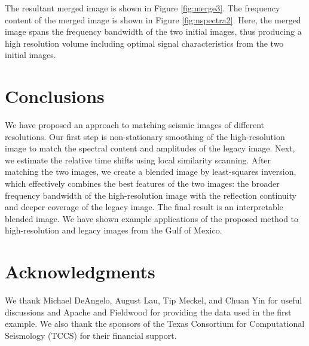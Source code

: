 The resultant merged image is shown in Figure \ref{fig:merge3}.
The frequency content of the merged image is shown in Figure \ref{fig:nspectra2}.
Here, the merged image spans the frequency bandwidth of the two initial images, thus producing a high resolution volume including optimal signal characteristics from the two initial images.




\section{Conclusions}

We have proposed an approach to matching seismic images of different resolutions.
Our first step is non-stationary smoothing of the high-resolution image to match the spectral content and amplitudes of the legacy image.
Next, we estimate the relative time shifts using local similarity scanning.
After matching the two images, we create a blended image by least-squares inversion, which effectively combines the best features of the two images: the broader frequency bandwidth of the high-resolution image with the reflection continuity and deeper coverage of the legacy image.
The final result is an interpretable blended image.
We have shown example applications of the proposed method to high-resolution and legacy images from the Gulf of Mexico.

\section{Acknowledgments}

We thank Michael DeAngelo, August Lau, Tip Meckel, and Chuan Yin for useful discussions and Apache and Fieldwood for providing the data used in the first example.
We also thank the sponsors of the Texas Consortium for Computational Seismology (TCCS) for their financial support.





